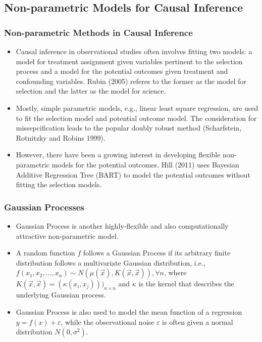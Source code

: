 \documentclass[xetex,mathserif,serif]{beamer}
\begin{document}
\subsection{Non-parametric Models for Causal Inference}
\begin{frame}
  \frametitle{Non-parametric Methods in Causal Inference}
  \begin{itemize}
  \item Causal inference in observational studies often involves fitting two
    models: a model for treatment assignment given variables pertinent to the
    selection process and a model for the potential outcomes given treatment and
    confounding variables. Rubin (2005) referes to the former as the model for
    selection and the latter as the model for science.
  \item Mostly, simple parametric models, e.g., linear least square regression,
    are used to fit the selection model and potential outcome model. The
    consideration for missepcification leads to the popular doubly robust method
    (Scharfstein, Rotnitzky and Robins 1999).
  \item However, there have been a growing interest in developing flexible
    non-parametric models for the potential outcomes. Hill (2011) uses Bayesian
    Additive Regression Tree (BART) to model the potential outcomes without fitting the
    selection models.
  \end{itemize}
\end{frame}

\begin{frame}
  \frametitle{Gaussian Processes}
  \begin{itemize}
  \item Gaussian Process is another highly-flexible and also computationally
    attractive non-parametric model.
  \item A random function $f$ follows a Gaussian Process if its arbitrary finite
    distribution follows a multivariate Gaussian distribution, i.e.,
    $f(x_1,x_2,\ldots,x_n)\sim N(\mu(\vec x), K(\vec x, \vec x)), \forall n$,
    where $K(\vec x, \vec x)=(\kappa(x_i, x_j)))_{n\times n}$ and $\kappa$ is the kernel
    that describes the underlying Gaussian process.
  \item Gaussian Process is also used to model the mean function of a regression
    $y=f(x)+\varepsilon$, while the observational noise $\varepsilon$ is often
    given a normal distribution $N(0, \sigma^2)$.
  \end{itemize}
\end{frame}
\end{document}
